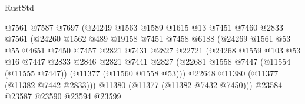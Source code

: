 \begin{lexlean}{RustStd}
\begin{coremodule}
                                  @7561
                                  @7587
                                  @7697
                                  (@24249
                                    @1563
                                    @1589
                                    @1615
                                    @13
                                    @7451
                                    @7460
                                    @2833
                                    @7561
                                    (@24260
                                      @1562
                                      @489
                                      @19158
                                      @7451
                                      @7458
                                      @6188
                                      (@24269
                                        @1561
                                        @53
                                        @55
                                        @4651
                                        @7450
                                        @7457
                                        @2821
                                        @7431
                                        @2827
                                        @22721
                                        (@24268
                                          @1559
                                          @103
                                          @53
                                          @16
                                          @7447
                                          @2833
                                          @2846
                                          @2821
                                          @7441
                                          @2827
                                          (@22681
                                            @1558
                                            @7447
                                            (@11554 (@11555 @7447))
                                            (@11377 (@11560 @1558 @53)))
                                          @22648
                                          @11380
                                          (@11377 (@11382 @7442 @2833)))
                                        @11380
                                        (@11377 (@11382 @7432 @7450)))
                                      @23584
                                      @23587
                                      @23590
                                      @23594
                                      @23599

\end{coremodule}
\end{lexlean}
